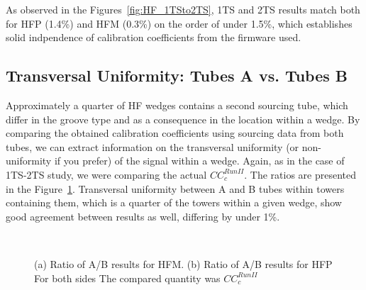 As observed in the Figures~\ref{fig:HF_1TSto2TS},
1TS and 2TS results match both for HFP (1.4\%) and HFM (0.3\%) on the order of
under 1.5\%, which establishes solid indpendence of calibration coefficients from
the firmware used.

\subsection{Transversal Uniformity: Tubes A vs. Tubes B}
Approximately a quarter of HF wedges contains a second sourcing tube, which
differ in the groove type and as a consequence in the location within a wedge.
By comparing the obtained calibration coefficients using sourcing data from both
tubes, we can extract information on the transversal uniformity (or non-uniformity if you prefer) of the signal
within a wedge. Again, as in the case of 1TS-2TS study, we were comparing the
actual ${CC}^{Run II}_{c}$. The ratios are presented in the Figure~\ref{fig:HF_A2B}. Transversal uniformity between A and B tubes within towers containing them, which is a quarter of the towers within a given wedge, show good agreement between results as well, differing by under 1\%.

\begin{figure}[htb]
    \begin{center}
        ~
        \caption
        {(a) Ratio of A/B results for HFM.
         (b) Ratio of A/B results for HFP
         For both sides The compared quantity was ${CC}^{Run II}_{c}$}
        \label{fig:HF_A2B}
    \end{center}
\end{figure}

